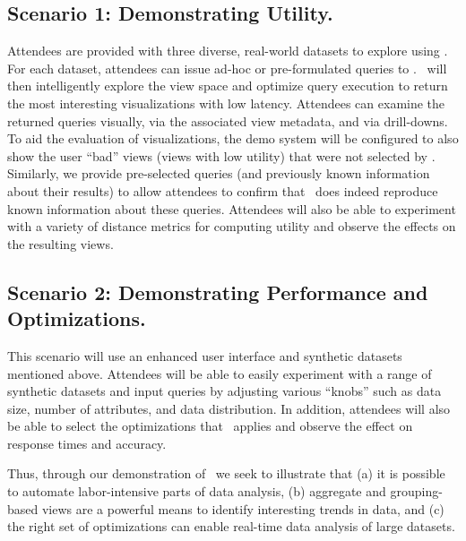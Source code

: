 \subsection {Scenario 1: Demonstrating Utility.} Attendees are provided with
three diverse, real-world datasets to explore using \SeeDB. For each dataset,
attendees can issue ad-hoc or pre-formulated queries to \SeeDB. \SeeDB\ will
then intelligently explore the view space and optimize query execution to return the
most interesting visualizations with low latency. Attendees can examine the
returned queries visually, via the associated view metadata, and via
drill-downs. To aid the evaluation of visualizations, the demo system will 
be configured to also show the user ``bad'' views (views with low utility) that were not selected
by \SeeDB.
Similarly, we provide pre-selected queries (and
previously known information about their results) to allow attendees to
confirm that \SeeDB\ does indeed reproduce known information about these
queries. Attendees will also be able to experiment with a
variety of distance metrics for computing utility and observe the effects on the
resulting views.


\subsection{Scenario 2: Demonstrating Performance and Optimizations.} This
scenario will use an enhanced user interface and synthetic datasets mentioned above.
Attendees will be able to easily experiment with a range of synthetic datasets and input
queries by adjusting various ``knobs'' such as data size, number of attributes, and
data distribution. In addition, attendees will also be able to select the
optimizations that \SeeDB\ applies and observe the effect on response times and
accuracy.

Thus, through our demonstration of \SeeDB\, we seek to illustrate that (a) it is
possible to automate labor-intensive parts of data analysis, (b) aggregate
and grouping-based views are a powerful means to identify interesting trends
in data, and (c) the right set of optimizations can enable real-time data
analysis of large datasets.
